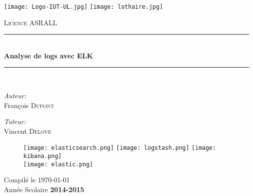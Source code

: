 \begin{titlepage}
\begin{center}
 \newcommand{\HRule}{\rule{\linewidth}{0.5mm}}

\texttt{[image: Logo-IUT-UL.jpg]}\hfill
\texttt{[image: lothaire.jpg]}
\vspace{1cm}

\textsc{\large Licence ASRALL}
\vspace{0.5cm}

\HRule \\[0.4cm]
{ \Large \bfseries Analyse de logs avec ELK\\[0.4cm] }

\HRule \\[1.0cm]

\noindent
\begin{minipage}{0.5\textwidth}
\begin{flushleft} \large
\emph{Auteur:}\\
François \textsc{Dupont}\\
\end{flushleft}
\end{minipage}%
\begin{minipage}{0.5\textwidth}
\begin{flushright} \large
\emph{Tuteur:} \\
Vincent \textsc{Delove}
\end{flushright}
\end{minipage}

%
\vspace{1cm}

\begin{figure}[h]
    \centering
    \texttt{[image: elasticsearch.png]}
    \hfill
    \texttt{[image: logstash.png]}
    \hfill
    \texttt{[image: kibana.png]}
    \\[20mm]
    \texttt{[image: elastic.png]}
\end{figure}

\vspace{3mm}
{Compilé le \today}\\[5mm]%
Année Scolaire \textbf{2014-2015}%

\end{center}
\end{titlepage}
